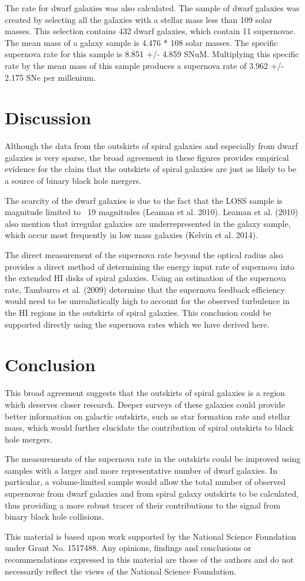 \documentclass[apj]{emulateapj}
\begin{document}
The rate for dwarf galaxies was also calculated. The sample of dwarf galaxies was created by selecting all the galaxies with a stellar mass less than 109 solar masses. This selection contains 432 dwarf galaxies, which contain 11 supernovae. The mean mass of a galaxy sample is 4.476 * 108 solar masses. The specific supernova rate for this sample is 8.851 +/- 4.859 SNuM. Multiplying this specific rate by the mean mass of this sample produces a supernova rate of 3.962 +/- 2.175 SNe per millenium.

\section{Discussion}

Although the data from the outskirts of spiral galaxies and especially from dwarf galaxies is very sparse, the broad agreement in these figures provides empirical evidence for the claim that the outskirts of spiral galaxies are just as likely to be a source of binary black hole mergers.

The scarcity of the dwarf galaxies is due to the fact that the LOSS sample is magnitude limited to ~19 magnitudes (Leaman et al. 2010). Leaman et al. (2010) also mention that irregular galaxies are underrepresented in the galaxy sample, which occur most frequently in low mass galaxies (Kelvin et al. 2014).

The direct measurement of the supernova rate beyond the optical radius also provides a direct method of determining the energy input rate of supernova into the extended HI disks of spiral galaxies. Using an estimation of the supernova rate, Tamburro et al. (2009) determine that the supernova feedback efficiency would need to be unrealistically high to account for the observed turbulence in the HI regions in the outskirts of spiral galaxies. This conclusion could be supported directly using the supernova rates which we have derived here.

\section{Conclusion}

This broad agreement suggests that the outskirts of spiral galaxies is a region which deserves closer research. Deeper surveys of these galaxies could provide better information on galactic outskirts, such as star formation rate and stellar mass, which would further elucidate the contribution of spiral outskirts to black hole mergers. 

The measurements of the supernova rate in the outskirts could be improved using samples with a larger and more representative number of dwarf galaxies. In particular, a volume-limited sample would allow the total number of observed supernovae from dwarf galaxies and from spiral galaxy outskirts to be calculated, thus providing a more robust tracer of their contributions to the signal from binary black hole collisions.


This material is based upon work supported by the National Science Foundation under Grant No. 1517488. Any opinions, findings and conclusions or recommendations expressed in this material are those of the authors and do not necessarily reflect the views of the National Science Foundation.
\end{document}
